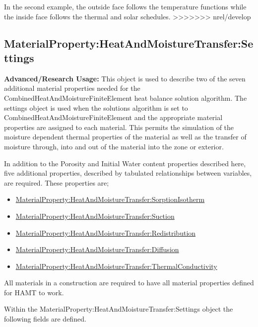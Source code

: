 In the second example, the outside face follows the temperature functions while the inside face follows the thermal and solar schedules.
>>>>>>> nrel/develop

\subsection{MaterialProperty:HeatAndMoistureTransfer:Settings}\label{materialpropertyheatandmoisturetransfersettings}

\textbf{Advanced/Research Usage:} This object is used to describe two of the seven additional material properties needed for the CombinedHeatAndMoistureFiniteElement heat balance solution algorithm. The settings object is used when the solutions algorithm is set to CombinedHeatAndMoistureFiniteElement and the appropriate material properties are assigned to each material. This permits the simulation of the moisture dependent thermal properties of the material as well as the transfer of moisture through, into and out of the material into the zone or exterior.

In addition to the Porosity and Initial Water content properties described here, five additional properties, described by tabulated relationships between variables, are required. These properties are;

\begin{itemize}
\item
  \hyperref[materialpropertyheatandmoisturetransfersorptionisotherm]{MaterialProperty:HeatAndMoistureTransfer:SorptionIsotherm}
\item
  \hyperref[materialpropertyheatandmoisturetransfersuction]{MaterialProperty:HeatAndMoistureTransfer:Suction}
\item
  \hyperref[materialpropertyheatandmoisturetransferredistribution]{MaterialProperty:HeatAndMoistureTransfer:Redistribution}
\item
  \hyperref[materialpropertyheatandmoisturetransferdiffusion]{MaterialProperty:HeatAndMoistureTransfer:Diffusion}
\item
  \hyperref[materialpropertyheatandmoisturetransferthermalconductivity]{MaterialProperty:HeatAndMoistureTransfer:ThermalConductivity}
\end{itemize}

All materials in a construction are required to have all material properties defined for HAMT to work.

Within the MaterialProperty:HeatAndMoistureTransfer:Settings object the following fields are defined.

